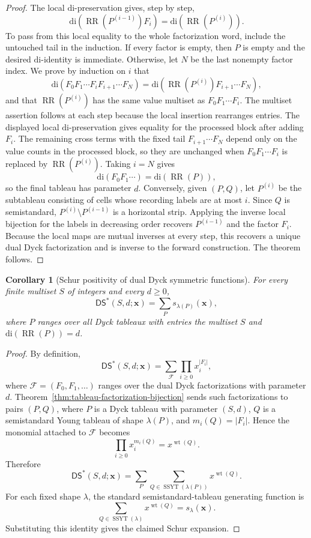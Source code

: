 \documentclass[11pt]{article}
\theoremstyle{plain}
\newtheorem{corollary}[theorem]{Corollary}
\theoremstyle{definition}
\theoremstyle{remark}
\newcommand{\di}{\mathrm{di}}
\newcommand{\DSstar}{\mathsf{DS}^{*}}
\begin{document}
\begin{proof}
The local \(\di\)-preservation gives, step by step,
\[
  \di(\operatorname{RR}(P^{(i-1)})F_i)
  =
  \di(\operatorname{RR}(P^{(i)})).
\]
To pass from this local equality to the whole factorization word, include the
untouched tail in the induction.  If every factor is empty, then \(P\) is empty
and the desired \(\di\)-identity is immediate.  Otherwise, let \(N\) be the last
nonempty factor index.
We prove by induction on \(i\) that
\[
  \di(F_0F_1\cdots F_iF_{i+1}\cdots F_N)
  =
  \di(\operatorname{RR}(P^{(i)})F_{i+1}\cdots F_N),
\]
and that \(\operatorname{RR}(P^{(i)})\) has the same value multiset as
\(F_0F_1\cdots F_i\).  The multiset assertion follows at each step because
the local insertion rearranges entries.  The displayed local
\(\di\)-preservation gives equality for the processed block after adding
\(F_i\).  The remaining cross terms with the fixed tail
\(F_{i+1}\cdots F_N\) depend only on the value counts in the processed block,
so they are unchanged when \(F_0F_1\cdots F_i\) is replaced by
\(\operatorname{RR}(P^{(i)})\).  Taking \(i=N\) gives
\[
  \di(F_0F_1\cdots)=\di(\operatorname{RR}(P)),
\]
so the final tableau has parameter \(d\).
Conversely, given \((P,Q)\), let \(P^{(i)}\) be the subtableau consisting of
cells whose recording labels are at most \(i\).  Since \(Q\) is semistandard,
\(P^{(i)}\setminus P^{(i-1)}\) is a horizontal strip.  Applying the inverse
local bijection for the labels in decreasing order recovers \(P^{(i-1)}\) and
the factor \(F_i\).  Because the local maps are mutual inverses at every step,
this recovers a unique dual Dyck factorization and is inverse to the forward
construction.  The theorem follows.
\end{proof}
\begin{corollary}[Schur positivity of dual Dyck symmetric functions]
\label{cor:dual-dyck-schur-positivity}
For every finite multiset \(S\) of integers and every \(d\ge 0\),
\[
  \DSstar(S,d;\mathbf{x})
  =
  \sum_P s_{\lambda(P)}(\mathbf{x}),
\]
where \(P\) ranges over all Dyck tableaux with entries the multiset \(S\) and
\(\di(\operatorname{RR}(P))=d\).
\end{corollary}
\begin{proof}
By definition,
\[
  \DSstar(S,d;\mathbf{x})
  =
  \sum_{\mathcal F}\prod_{i\ge 0}x_i^{|F_i|},
\]
where \(\mathcal F=(F_0,F_1,\ldots)\) ranges over the dual Dyck factorizations
with parameter \(d\).  Theorem~\ref{thm:tableau-factorization-bijection} sends
such factorizations to pairs \((P,Q)\), where \(P\) is a Dyck tableau with
parameter \((S,d)\), \(Q\) is a semistandard Young tableau of shape
\(\lambda(P)\), and \(m_i(Q)=|F_i|\).  Hence the monomial attached to
\(\mathcal F\) becomes
\[
  \prod_{i\ge 0}x_i^{m_i(Q)}=x^{\operatorname{wt}(Q)}.
\]
Therefore
\[
  \DSstar(S,d;\mathbf{x})
  =
  \sum_P\sum_{Q\in \operatorname{SSYT}(\lambda(P))}
  x^{\operatorname{wt}(Q)}.
\]
For each fixed shape \(\lambda\), the standard semistandard-tableau generating
function is
\[
  \sum_{Q\in \operatorname{SSYT}(\lambda)}x^{\operatorname{wt}(Q)}
  =s_\lambda(\mathbf{x}).
\]
Substituting this identity gives the claimed Schur expansion.
\end{proof}
\end{document}
